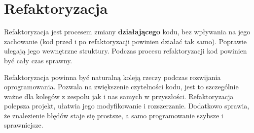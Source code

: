 \section{Refaktoryzacja}

Refaktoryzacja jest procesem zmiany \textbf{działającego} kodu, bez wpływania na jego zachowanie (kod przed i po refaktoryzacji powinien działać tak samo). Poprawie ulegają jego wewnętrzne struktury. Podczas procesu refaktoryzacji kod powinien być cały czas sprawny. 

Refaktoryzacja powinna być naturalną koleją rzeczy podczas rozwijania oprogramowania. Pozwala na zwiększenie czytelności kodu, jest to szczególnie ważne dla kolegów z zespołu jak i nas samych w przyszłości. Refaktoryzacja polepsza projekt, ułatwia jego modyfikowanie i rozszerzanie. Dodatkowo sprawia, że znalezienie błędów staje się prostsze, a samo programowanie szybsze i sprawniejsze.

